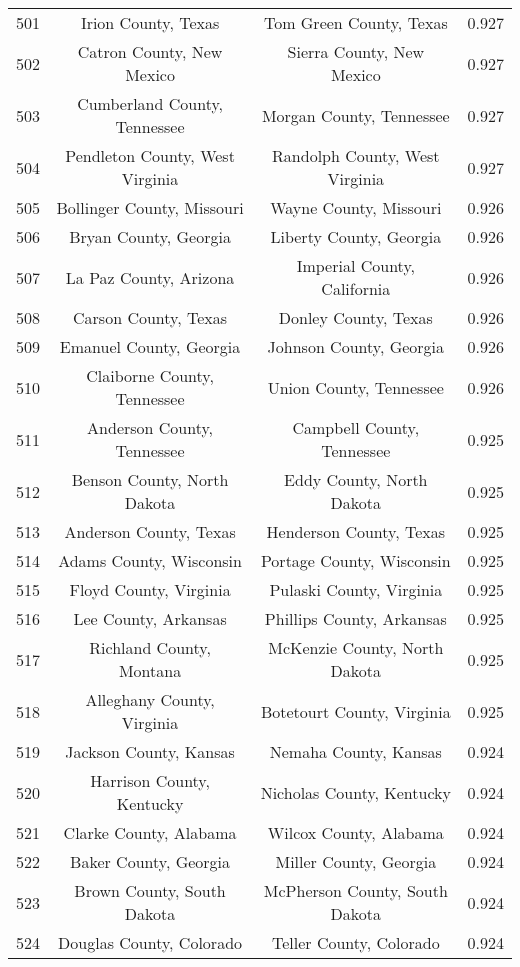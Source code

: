 \begin{longtable}{cccc}
  501 & Irion County, Texas & Tom Green County, Texas & 0.927 \\ 
  502 & Catron County, New Mexico & Sierra County, New Mexico & 0.927 \\ 
  503 & Cumberland County, Tennessee & Morgan County, Tennessee & 0.927 \\ 
  504 & Pendleton County, West Virginia & Randolph County, West Virginia & 0.927 \\ 
  505 & Bollinger County, Missouri & Wayne County, Missouri & 0.926 \\ 
  506 & Bryan County, Georgia & Liberty County, Georgia & 0.926 \\ 
  507 & La Paz County, Arizona & Imperial County, California & 0.926 \\ 
  508 & Carson County, Texas & Donley County, Texas & 0.926 \\ 
  509 & Emanuel County, Georgia & Johnson County, Georgia & 0.926 \\ 
  510 & Claiborne County, Tennessee & Union County, Tennessee & 0.926 \\ 
  511 & Anderson County, Tennessee & Campbell County, Tennessee & 0.925 \\ 
  512 & Benson County, North Dakota & Eddy County, North Dakota & 0.925 \\ 
  513 & Anderson County, Texas & Henderson County, Texas & 0.925 \\ 
  514 & Adams County, Wisconsin & Portage County, Wisconsin & 0.925 \\ 
  515 & Floyd County, Virginia & Pulaski County, Virginia & 0.925 \\ 
  516 & Lee County, Arkansas & Phillips County, Arkansas & 0.925 \\ 
  517 & Richland County, Montana & McKenzie County, North Dakota & 0.925 \\ 
  518 & Alleghany County, Virginia & Botetourt County, Virginia & 0.925 \\ 
  519 & Jackson County, Kansas & Nemaha County, Kansas & 0.924 \\ 
  520 & Harrison County, Kentucky & Nicholas County, Kentucky & 0.924 \\ 
  521 & Clarke County, Alabama & Wilcox County, Alabama & 0.924 \\ 
  522 & Baker County, Georgia & Miller County, Georgia & 0.924 \\ 
  523 & Brown County, South Dakota & McPherson County, South Dakota & 0.924 \\ 
  524 & Douglas County, Colorado & Teller County, Colorado & 0.924 \\ 

\end{longtable}

